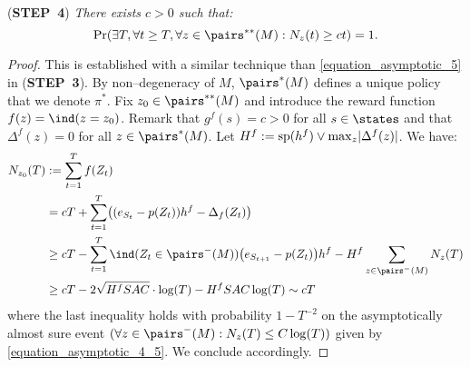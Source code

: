 \documentclass[preprint,cleveref,12pt]{colt2025}
\DeclarePairedDelimiter{\parens}{(}{)}	%
\DeclarePairedDelimiter{\abs}{\lvert}{\rvert}	%
\newcommand{\indic}[1]{\ind\parens{#1}}
\def\indicator{\indic}
\newcommand{\vecspan}[1]{\mathrm{sp}\parens{#1}}
\def\STEP#1{(\strong{STEP~#1})}
\newcommand{\strong}[1]{\textbf{#1}}
\begin{document}
    \noindent
    \STEP{4}
    \textit{
        There exists $c > 0$ such that:
        \begin{equation}
        \label{equation_asymptotic_6}
            \Pr \parens*{
                \exists T, \forall t \ge T, \forall z \in \pairs^{**}(M):
                N_z(t) \ge c t
            }
            = 1.
        \end{equation}
    }
    \begin{proof}
        This is established with a similar technique than \eqref{equation_asymptotic_5} in \STEP{3}.
        By non--degeneracy of $M$, $\pairs^*(M)$ defines a unique policy that we denote $\pi^*$.
        Fix $z_0 \in \pairs^{**}(M)$ and introduce the reward function $f(z) = \indicator{z = z_0}$.
        Remark that $g^f(s) = c > 0$ for all $s \in \states$ and that $\Delta^f(z) = 0$ for all $z \in \pairs^*(M)$.
        Let $H^f := \vecspan{h^f} \vee \max_z \abs{\Delta^f(z)}$.
        We have:
        \begin{align*}
            N_{z_0}(T)
            & := 
            \sum_{t=1}^T f(Z_t)
            \\
            & =
            cT + \sum_{t=1}^T \parens*{
                \parens*{e_{S_t} - p(Z_t)} h^f
                - \Delta_f (Z_t)
            }
            \\
            & \ge 
            cT 
            - \sum_{t=1}^T \indicator{Z_t \in \pairs^-(M)} \parens*{e_{S_{t+1}} - p(Z_t)} h^f
            - H^f \sum_{z \in \pairs^-(M)} N_z(T)
            \\
            & \ge 
            cT - 2 \sqrt{H^fSAC} \cdot \log(T)
            - H^f S A C \log(T)
            \sim cT
        \end{align*}
        where the last inequality holds with probability $1 - T^{-2}$ on the asymptotically almost sure event $(\forall z \in \pairs^-(M): N_z(T) \le C \log(T))$ given by \eqref{equation_asymptotic_4_5}.
        We conclude accordingly.
    \end{proof}
\end{document}
